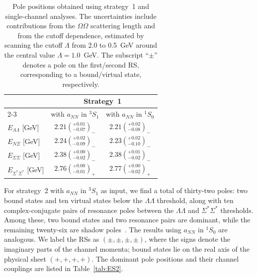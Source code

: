\documentclass[prl,showpacs,twocolumn,superscriptaddress,floatfix,10pt,footinbib]{revtex4-2}
\begin{document}
\begin{table}[tb]
\centering
\caption{Pole positions obtained using strategy~1 and single-channel analyses. The uncertainties include contributions from the $\Omega\Omega$ scattering length and from the cutoff dependence, estimated by scanning the cutoff $\Lambda$ from 2.0 to 0.5~GeV around the central value $\Lambda=1.0$~GeV. The subscript ``$\pm$'' denotes a pole on the first/second RS, corresponding to a bound/virtual state, respectively. }
\begin{tabular}{p{6em}cc}
\toprule
\multirow{2}{*}{} & \multicolumn{2}{c}{Strategy~1} \\
\cmidrule(lr){2-3}
& with $a_{NN}$ in $^3S_1$ & with $a_{NN}$ in $^1S_0$ \\
\midrule
$E_{\Lambda\Lambda}$ [GeV]
& $2.21\left(^{+0.01}_{-0.07}\right)_-$
& $2.21\left(^{+0.02}_{-0.08}\right)_-$ \\[5pt]
$E_{N\Xi}$ [GeV]
& $2.24\left(^{+0.02}_{-0.09}\right)_-$
& $2.23\left(^{+0.02}_{-0.10}\right)_-$ \\[5pt]
$E_{\Sigma\Sigma}$ [GeV]
& $2.38\left(^{+0.00}_{-0.02}\right)_-$
& $2.38\left(^{+0.01}_{-0.02}\right)_-$ \\[5pt]
$E_{\Sigma^*\Sigma^*}$ [GeV]
& $2.76\left(^{+0.00}_{-0.01}\right)_+$
& $2.77\left(^{+0.00}_{-0.02}\right)_+$ \\
\bottomrule
\end{tabular}
\label{tab:ES1}
\end{table}

For strategy~2 with $a_{NN}$ in $^3S_1$ as input, we find a total of thirty-two poles: two bound states and ten virtual states below the $\Lambda\Lambda$ threshold, along with ten complex-conjugate pairs of resonance poles between the $\Lambda\Lambda$ and $\Sigma^*\Sigma^*$ thresholds. Among these, two bound states and two resonance pairs are dominant, while the remaining twenty-six are shadow poles~\cite{Eden:1964zz}. The results using $a_{NN}$ in $^1S_0$ are analogous. We label the RSs as $(\pm,\pm,\pm,\pm)$, where the signs denote the imaginary parts of the channel momenta; bound states lie on the real axis of the physical sheet $(+,+,+,+)$. The dominant pole positions and their channel couplings are listed in Table~\ref{tab:ES2}.
\end{document}
